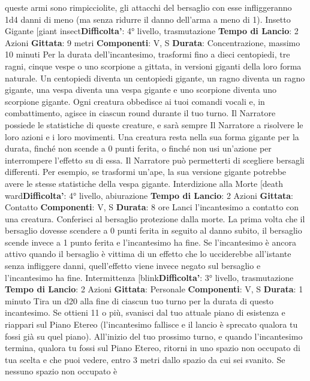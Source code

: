 \begin{multicols}{2}
queste armi sono rimpicciolite, gli attacchi del bersaglio
con esse infliggeranno 1d4 danni di meno (ma senza
ridurre il danno dell’arma a meno di 1).
Insetto Gigante
[giant insect\textbf{Difficolta'}:
4° livello, trasmutazione
\textbf{Tempo di Lancio}: 2 Azioni
\textbf{Gittata}: 9 metri
\textbf{Componenti}: V, S
\textbf{Durata}: Concentrazione, massimo 10 minuti
Per la durata dell’incantesimo, trasformi fino a dieci
centopiedi, tre ragni, cinque vespe o uno scorpione a
gittata, in versioni giganti della loro forma naturale. Un
centopiedi diventa un centopiedi gigante, un ragno
diventa un ragno gigante, una vespa diventa una vespa
gigante e uno scorpione diventa uno scorpione gigante.
Ogni creatura obbedisce ai tuoi comandi vocali e, in
combattimento, agisce in ciascun round durante il tuo
turno. Il Narratore possiede le statistiche di queste creature, e
sarà sempre Il Narratore a risolvere le loro azioni e i loro
movimenti.
Una creatura resta nella sua forma gigante per la
durata, finché non scende a 0 punti ferita, o finché non
usi un’azione per interrompere l’effetto su di essa.
Il Narratore può permetterti di scegliere bersagli differenti. Per
esempio, se trasformi un’ape, la sua versione gigante
potrebbe avere le stesse statistiche della vespa
gigante.
Interdizione alla Morte
[death ward\textbf{Difficolta'}:
4° livello, abiurazione
\textbf{Tempo di Lancio}: 2 Azioni
\textbf{Gittata}: Contatto
\textbf{Componenti}: V, S
\textbf{Durata}: 8 ore
Lanci l’incantesimo a contatto con una creatura.
Conferisci al bersaglio protezione dalla morte.
La prima volta che il bersaglio dovesse scendere a 0
punti ferita in seguito al danno subito, il bersaglio
scende invece a 1 punto ferita e l’incantesimo ha fine.
Se l’incantesimo è ancora attivo quando il bersaglio è
vittima di un effetto che lo ucciderebbe all’istante senza
infliggere danni, quell’effetto viene invece negato sul
bersaglio e l’incantesimo ha fine.
Intermittenza
[blink\textbf{Difficolta'}:
3° livello, trasmutazione
\textbf{Tempo di Lancio}: 2 Azioni
\textbf{Gittata}: Personale
\textbf{Componenti}: V, S
\textbf{Durata}: 1 minuto
Tira un d20 alla fine di ciascun tuo turno per la durata di
questo incantesimo. Se ottieni 11 o più, svanisci dal tuo
attuale piano di esistenza e riappari sul Piano Etereo
(l’incantesimo fallisce e il lancio è sprecato qualora tu
fossi già su quel piano). All’inizio del tuo prossimo
turno, e quando l’incantesimo termina, qualora tu fossi
sul Piano Etereo, ritorni in uno spazio non occupato di
tua scelta e che puoi vedere, entro 3 metri dallo spazio
da cui sei svanito. Se nessuno spazio non occupato è

\end{multicols}
